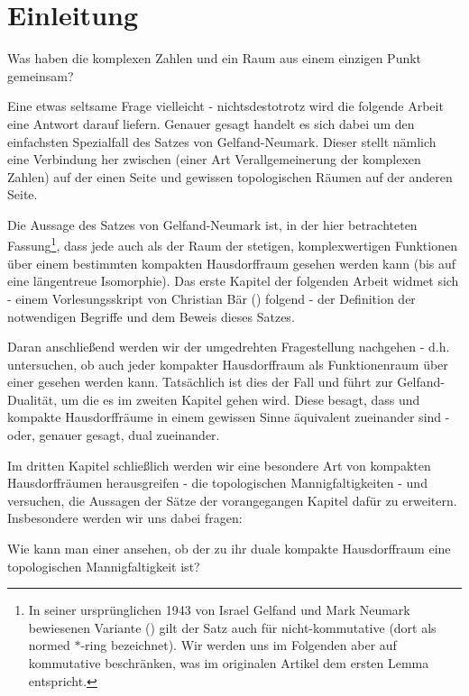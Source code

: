 {}
\section*{Einleitung}

\begin{center}
Was haben die komplexen Zahlen und ein Raum aus einem einzigen Punkt gemeinsam? 
\end{center}

Eine etwas seltsame Frage vielleicht - nichtsdestotrotz wird die folgende Arbeit eine Antwort darauf liefern. Genauer gesagt handelt es sich dabei um den einfachsten Spezialfall des Satzes von Gelfand-Neumark. Dieser stellt nämlich eine Verbindung her zwischen \CAlgn{} (einer Art Verallgemeinerung der komplexen Zahlen) auf der einen Seite und gewissen topologischen Räumen auf der anderen Seite. 

Die Aussage des Satzes von Gelfand-Neumark ist, in der hier betrachteten Fassung\footnote{In seiner ursprünglichen 1943 von Israel Gelfand und Mark Neumark bewiesenen Variante (\cite[Theorem 1]{GN1943}) gilt der Satz auch für nicht-kommutative \CAlgn{} (dort als \glqq normed $*$-ring\grqq{} bezeichnet). Wir werden uns im Folgenden aber auf kommutative \CAlgn{} beschränken, was im originalen Artikel dem ersten Lemma entspricht.}, dass jede \CAlg{} auch als der Raum der stetigen, komplexwertigen Funktionen über einem bestimmten kompakten Hausdorffraum gesehen werden kann (bis auf eine längentreue Isomorphie). Das erste Kapitel der folgenden Arbeit widmet sich - einem Vorlesungsskript von Christian Bär (\cite[S. 49-69]{Baer2003}) folgend - der Definition der notwendigen Begriffe und dem Beweis dieses Satzes.

Daran anschließend werden wir der \glqq umgedrehten\grqq{} Fragestellung nachgehen - d.h. untersuchen, ob auch jeder kompakter Hausdorffraum als Funktionenraum über einer \CAlg{} gesehen werden kann. Tatsächlich ist dies der Fall und führt zur Gelfand-Dualität, um die es im zweiten Kapitel gehen wird. Diese besagt, dass \CAlgn{} und kompakte Hausdorffräume in einem gewissen Sinne äquivalent zueinander sind - oder, genauer gesagt, dual zueinander.

Im dritten Kapitel schließlich werden wir eine besondere Art von kompakten Hausdorffräumen herausgreifen - die topologischen Mannigfaltigkeiten - und versuchen, die Aussagen der Sätze der vorangegangen Kapitel dafür zu erweitern. Insbesondere werden wir uns dabei fragen:

\begin{center}
Wie kann man einer \CAlg{} \glqq ansehen\grqq{}, ob der zu ihr duale kompakte Hausdorffraum eine topologischen Mannigfaltigkeit ist?
\end{center}